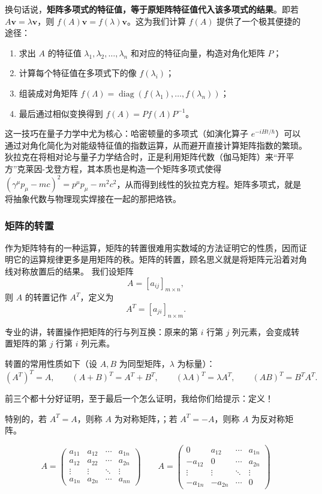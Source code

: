 \documentclass[UTF8]{ctexbook}
\begin{document}
\noindent 换句话说，\textbf{矩阵多项式的特征值，等于原矩阵特征值代入该多项式的结果}。即若 $A\mathbf{v} = \lambda \mathbf{v}$，则 $f(A)\mathbf{v} = f(\lambda)\mathbf{v}$。这为我们计算 $f(A)$ 提供了一个极其便捷的途径：

\begin{enumerate}
    \item 求出 $A$ 的特征值 $\lambda_1, \lambda_2, \dots, \lambda_n$ 和对应的特征向量，构造对角化矩阵 $P$；
    \item 计算每个特征值在多项式下的像 $f(\lambda_i)$；
    \item 组装成对角矩阵 $f(\Lambda) = \operatorname{diag}(f(\lambda_1), \dots, f(\lambda_n))$；
    \item 最后通过相似变换得到 $f(A) = P f(\Lambda) P^{-1}$。
\end{enumerate}

这一技巧在量子力学中尤为核心：哈密顿量的多项式（如演化算子 $e^{-iHt/\hbar}$）可以通过对角化简化为对能级特征值的指数运算，从而避开直接计算矩阵指数的繁琐。狄拉克在将相对论与量子力学结合时，正是利用矩阵代数（伽马矩阵）来“开平方”克莱因-戈登方程，其本质也是构造一个矩阵多项式使得 $(\gamma^\mu p_\mu - mc)^2 = p^\mu p_\mu - m^2c^2$，从而得到线性的狄拉克方程。矩阵多项式，就是将抽象代数与物理现实焊接在一起的那把烙铁。

\subsubsection{矩阵的转置}

作为矩阵特有的一种运算，矩阵的转置很难用实数域的方法证明它的性质，因而证明它的运算规律更多是用矩阵的秩。矩阵的转置，顾名思义就是将矩阵元沿着对角线对称放置后的结果。
我们设矩阵
\[
A=\left[a_{ij}\right]_{m\times n},
\]
则 $A$ 的转置记作 $A^T$，定义为
\[
A^T=\left[a_{ji}\right]_{n\times m}.
\]

专业的讲，转置操作把矩阵的行与列互换：原来的第 $i$ 行第 $j$ 列元素，会变成转置矩阵的第 $j$ 行第 $i$ 列元素。

转置的常用性质如下（设 $A,B$ 为同型矩阵，$\lambda$ 为标量）：
\[
(A^T)^T=A,
\qquad
(A+B)^T=A^T+B^T,
\qquad
(\lambda A)^T=\lambda A^T,
\qquad
(AB)^T=B^TA^T.
\]

前三个都十分好证明，至于最后一个怎么证明，我给你们给提示：定义！

特别的，若 $A^T=A$，则称 $A$ 为对称矩阵，；若 $A^T=-A$，则称 $A$ 为反对称矩阵。

\[
A = \begin{pmatrix}
a_{11} & a_{12} & \cdots & a_{1n} \\
a_{12} & a_{22} & \cdots & a_{2n} \\
\vdots & \vdots & \ddots & \vdots \\
a_{1n} & a_{2n} & \cdots & a_{nn}
\end{pmatrix}
\qquad
A = \begin{pmatrix}
0 & a_{12} & \cdots & a_{1n} \\
-a_{12} & 0 & \cdots & a_{2n} \\
\vdots & \vdots & \ddots & \vdots \\
-a_{1n} & -a_{2n} & \cdots & 0
\end{pmatrix}
\]
\end{document}
